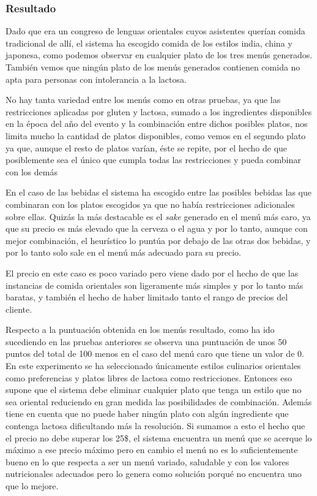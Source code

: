 \documentclass{article}
\begin{document}
\subsubsection{Resultado}
Dado que era un congreso de lenguas orientales cuyos asistentes querían comida tradicional de allí, el sistema ha escogido comida de los estilos india, china y japonesa, como podemos observar en cualquier plato de los tres menús generados. También vemos que ningún plato de los menús generados contienen comida no apta para personas con intolerancia a la lactosa.
\par
No hay tanta variedad entre los menús como en otras pruebas, ya que las restricciones aplicadas por gluten y lactosa, sumado a los ingredientes disponibles en la época del año del evento y la combinación entre dichos posibles platos, nos limita mucho la cantidad de platos disponibles, como vemos en el segundo plato ya que, aunque el resto de platos varían, éste se repite, por el hecho de que posiblemente sea el único que cumpla todas las restricciones y pueda combinar con los demás
\par
En el caso de las bebidas el sistema ha escogido entre las posibles bebidas las que combinaran con los platos escogidos ya que no había restricciones adicionales sobre ellas. Quizás la más destacable es el \textit{sake} generado en el menú más caro, ya que su precio es más elevado que la cerveza o el agua y por lo tanto, aunque con mejor combinación, el heurístico lo puntúa por debajo de las otras dos bebidas, y por lo tanto solo sale en el menú más adecuado para su precio.
\par
El precio en este caso es poco variado pero viene dado por el hecho de que las instancias de comida orientales son ligeramente más simples y por lo tanto más baratas, y también el hecho de haber limitado tanto el rango de precios del cliente.
\par
Respecto a la puntuación obtenida en los menús resultado, como ha ido sucediendo en las pruebas anteriores se observa una puntuación de unos 50 puntos del total de 100 menos en el caso del menú caro que tiene un valor de 0. En este experimento se ha seleccionado únicamente estilos culinarios orientales como preferencias y platos libres de lactosa como restricciones. Entonces eso supone que el sistema debe eliminar cualquier plato que tenga un estilo que no sea oriental reduciendo en gran medida las posibilidades de combinación. Además tiene en cuenta que no puede haber ningún plato con algún ingrediente que contenga lactosa dificultando más la resolución. Si sumamos a esto el hecho que el precio no debe superar los 25\$, el sistema encuentra un menú que se acerque lo máximo a ese precio máximo pero en cambio el menú no es lo suficientemente bueno en lo que respecta a ser un menú variado, saludable y con los valores nutricionales adecuados pero lo genera como solución porqué no encuentra uno que lo mejore.
\end{document}
